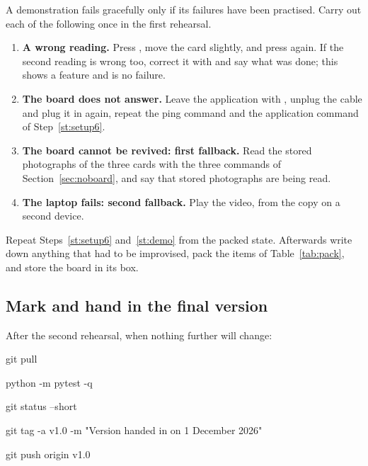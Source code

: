 \label{st:drills}
A demonstration fails gracefully only if its failures have been practised. Carry out each of
the following once in the first rehearsal.
\begin{enumerate}
\item \textbf{A wrong reading.} Press , move the card slightly, and press 
  again. If the second reading is wrong too, correct it with  and say what was done;
  this shows a feature and is no failure.
\item \textbf{The board does not answer.} Leave the application with , unplug the cable
  and plug it in again, repeat the ping command and the application command of
  Step~\ref{st:setup6}.
\item \textbf{The board cannot be revived: first fallback.} Read the stored photographs of the
  three cards with the three commands of Section~\ref{sec:noboard}, and say that stored
  photographs are being read.
\item \textbf{The laptop fails: second fallback.} Play the video, from the copy on a second
  device.
\end{enumerate}

Repeat Steps~\ref{st:setup6} and~\ref{st:demo} from the packed state. Afterwards write down
anything that had to be improvised, pack the items of Table~\ref{tab:pack}, and store the board
in its box.

\subsection{Mark and hand in the final version}

\label{st:release}
After the second rehearsal, when nothing further will change:
\begin{ps}
git pull
\end{ps}
\begin{ps}
python -m pytest -q
\end{ps}
\begin{ps}
git status --short
\end{ps}
\begin{ps}
git tag -a v1.0 -m "Version handed in on 1 December 2026"
\end{ps}
\begin{ps}
git push origin v1.0
\end{ps}

